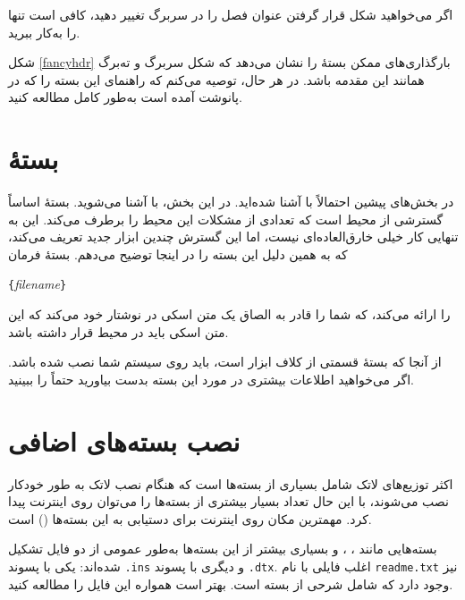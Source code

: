 اگر می‌خواهید شکل قرار گرفتن عنوان فصل را در سربرگ تغییر دهید، کافی است تنها 
 را به‌کار ببرید. 

 
شکل 
\ref{fancyhdr}
بارگذاری‌های ممکن بستهٔ  را نشان می‌دهد که شکل سربرگ و ته‌برگ همانند این مقدمه باشد. در هر حال، توصیه می‌کنم که راهنمای این بسته را که در پانوشت آمده است به‌طور کامل مطالعه کنید.
\section{\texorpdfstring{بستهٔ }{بستهٔ verbatim}}
در بخش‌های پیشین احتمالاً با   آشنا شده‌اید. در این بخش، با  
آشنا می‌شوید. بستهٔ  اساساً گسترشی از محیط  است که تعدادی از مشکلات این محیط را برطرف می‌کند. این به‌ تنهایی کار خیلی خارق‌العاده‌ای نیست، اما این گسترش چندین ابزار جدید تعریف می‌کند، که به همین دلیل این بسته را در اینجا توضیح می‌دهم. بستهٔ  فرمان 

\begin{lscommand}
\verb|{|\emph{filename}\verb|}|
\end{lscommand}

\noindent را ارائه می‌کند، که شما را قادر به الصاق یک متن اسکی در نوشتار‌ خود می‌کند که این متن اسکی باید در محیط  قرار داشته باشد.

از آنجا که بستهٔ  قسمتی از کلاف ابزار است، باید روی سیستم شما نصب شده باشد. اگر می‌خواهید اطلاعات بیشتری در مورد این بسته بدست بیاورید حتماً  
\cite{verbatim} را ببینید.
\section{نصب بسته‌های اضافی}

اکثر توزیع‌های لاتک شامل بسیاری از بسته‌ها است که هنگام نصب لاتک به طور خودکار نصب می‌شوند، با این حال تعداد بسیار بیشتری از بسته‌ها را می‌توان روی اینترنت پیدا کرد. مهمترین مکان روی اینترنت برای دستیابی به این بسته‌ها  () است.

بسته‌هایی مانند ، ، و بسیاری بیشتر از این بسته‌ها به‌طور عمومی از دو فایل تشکیل شده‌اند: یکی با پسوند \texttt{.ins} و دیگری با پسوند \texttt{.dtx}. اغلب فایلی با نام  \texttt{readme.txt} نیز وجود دارد که شامل شرحی از بسته است. بهتر است همواره این فایل را مطالعه کنید.

